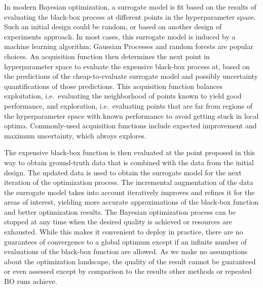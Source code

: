 \documentclass{article}
\begin{document}
In modern Bayesian optimization, a surrogate model is fit based on the results
of evaluating the black-box process at different points in the hyperparameter
space. Such an initial design could be random, or based on another design of
experiments approach. In most cases, this surrogate model is induced by a
machine learning algorithm; Gaussian Processes and random forests are popular
choices. An acquisition function then determines the next point in
hyperparameter space to evaluate the expensive black-box process at, based on
the predictions of the cheap-to-evaluate surrogate model and possibly
uncertainty quantifications of those predictions. This acquisition function
balances exploitation, i.e.\ evaluating the neighborhood of points known to
yield good performance, and exploration, i.e.\ evaluating points that are far
from regions of the hyperparameter space with known performance to avoid getting
stuck in local optima. Commonly-used acquisition functions include expected
improvement and maximum uncertainty, which always explores.

The expensive black-box function is then evaluated at the point proposed in
this way to obtain ground-truth data that is combined with the data from the
initial design. The updated data is used to obtain the surrogate model for the
next iteration of the optimization process. The incremental augmentation of the
data the surrogate model takes into account iteratively improves and refines it
for the areas of interest, yielding more accurate approximations of the
black-box function and better optimization results. The Bayesian optimization
process can be stopped at any time when the desired quality is achieved or
resources are exhausted. While this makes it convenient to deploy in practice,
there are no guarantees of convergence to a global optimum except if an infinite
number of evaluations of the black-box function are allowed. As we make no
assumptions about the optimization landscape, the quality of the result cannot
be guaranteed or even assessed except by comparison to the results other methods
or repeated BO runs achieve.
\end{document}
